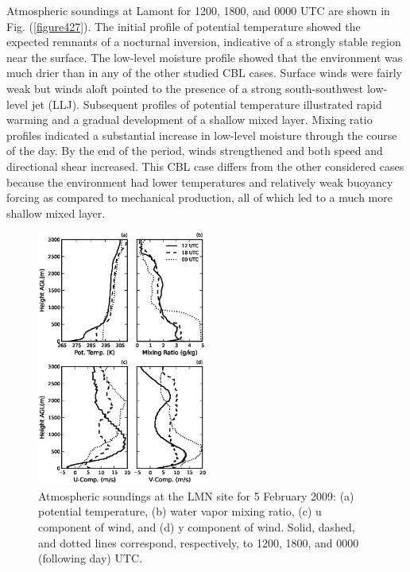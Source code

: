 Atmospheric soundings at Lamont for 1200, 1800, and 0000 UTC are shown in Fig. (\autoref{figure427}). The initial profile of potential temperature showed the expected remnants of a nocturnal inversion, indicative of a strongly stable region near the surface. The low-level moisture profile showed that the environment was much drier than in any of the other studied CBL cases. Surface winds were fairly weak but winds aloft pointed to the presence of a strong south-southwest low-level jet (LLJ). Subsequent profiles of potential temperature illustrated rapid warming and a gradual development of a shallow mixed layer. Mixing ratio profiles indicated a substantial increase in low-level moisture through the course of the day. By the end of the period, winds strengthened and both speed and directional shear increased. This CBL case differs from the other considered cases because the environment had lower temperatures and relatively weak buoyancy forcing as compared to mechanical production, all of which led to a much more shallow mixed layer.


\begin{figure}[H]
\begin{center}
\includegraphics[width=0.5\textwidth]{figures/chapter4/20090205_lmnsounding}
\end{center}
\caption{Atmospheric soundings at the LMN site for 5 February 2009: (a) potential temperature, (b) water vapor mixing ratio, (c) u component of wind, and (d) y component of wind. Solid, dashed, and dotted lines correspond, respectively, to 1200, 1800, and 0000 (following day) UTC.}
\label{figure427}
\end{figure}


